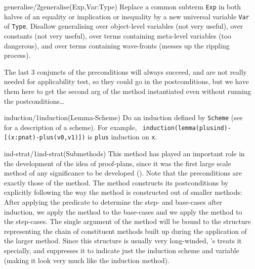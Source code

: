 \begin{method}{generalise/2}{generalise(Exp,Var:Type)}%
{\tiny
}
Replace a common subterm {\tt Exp} in both halves of an equality or
implication or inequality by a new universal variable {\tt Var} of
{\tt Type}.  Disallow generalising over object-level variables (not
very useful), over constants (not very useful), over terms containing
meta-level variables (too dangerous), and over terms containing
wave-fronts (messes up the rippling process).

The last 3 conjuncts of the preconditions will always succeed, and are
\notnice not really needed for applicability test, so they could go in
the postconditions, but we have them here to get the second arg of the
method instantiated even without running the postconditions\ldots
\end{method}

\begin{method}{induction/1}{induction(Lemma-Scheme)}%
{\tiny
}
Do an induction defined by {\tt Scheme} (see  for a
description of a scheme).  For example, {\tt
induction(lemma(plusind)-[(x:pnat)-plus(v0,v1)])} is {\tt plus}
induction on {\tt x}.
\end{method}

\begin{method}{ind-strat/1}{ind-strat(Submethods)}%
{\tiny
}
This method has played an important role in the development of the
idea of proof-plans, since it was the first large scale method of any
significance to be developed (\cite{pub349}).  Note that the
preconditions are exactly those of the  method.  The
method constructs its postconditions by explicitly following the way
the method is constructed out of smaller methods: After applying the
 predicate to determine the step- and base-cases after
induction, we apply the  method to the base-cases and
we apply the  method to the step-cases. The single
argument of the  method will be bound to the structure
representing the chain of constituent methods built up during the
application of the larger method. Since this structure is usually very
long-winded, {\clam}'s  treats it specially, and
suppresses it to indicate just the induction scheme and variable
(making it look very much like the induction method).

\end{method}

